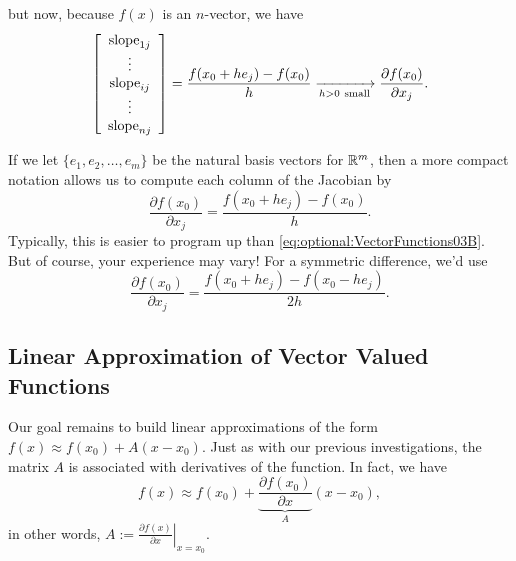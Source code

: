 \begin{tcolorbox}
but now, because $f(x)$ is an $n$-vector, we have 
\begin{equation}
    \label{eq:optional:SummaryJacobian02}
    \left[\begin{array}{c}  \text{\rm slope}_{1j}\\ \vdots \\ \text{\rm slope}_{ij} \\ \vdots \\ \text{\rm slope}_{nj} \end{array}  \right] = \frac{f(x_0+h e_j)-f(x_0)}{h}  \xrightarrow[h>0~\text{small}]{} \frac{\partial f(x_0)}{\partial x_j}. 
\end{equation}
\end{tcolorbox}

\begin{tcolorbox}[title=\textbf{Compact Way to Numerically Approximate the Jacobian}]
If we let $\{e_1, e_2, \ldots, e_m \}$ be the natural basis vectors for $\mathbb R^m$, then a more compact notation allows us to compute each column of the Jacobian by 
\begin{equation}
    \label{eq:optional:SummaryGradient01A}
    \frac{\partial f(x_0)}{\partial x_j} = \frac{f(x_0+h e_j)-f(x_0)}{h}.
    \end{equation}
    Typically, this is easier to program up than \eqref{eq:optional:VectorFunctions03B}. But of course, your experience may vary! For a symmetric difference, we'd use
    \begin{equation}
    \label{eq:optional:SummaryGradient01B}
    \frac{\partial f(x_0)}{\partial x_j} = \frac{f(x_0+h e_j)-f(x_0- h e_j)}{2h}.
    \end{equation}
\end{tcolorbox}

\subsection{Linear Approximation of Vector Valued Functions}

 Our goal remains to build linear approximations of the form $f(x) \approx f(x_0) + A ( x - x_0)$. Just as with our previous investigations, the matrix $A$ is associated with derivatives of the function. In fact, we have 
 \begin{equation}
     \label{eq:optional:VectorJacobianBasedLinearApprox}
     f(x) \approx f(x_0) + \underbrace{\frac{\partial f(x_0)}{\partial x}}_{A}  ( x - x_0),
 \end{equation}
 in other words, $A:=\left. \frac{\partial f(x)}{\partial x}\right|_{x=x_0}$.\\
 
